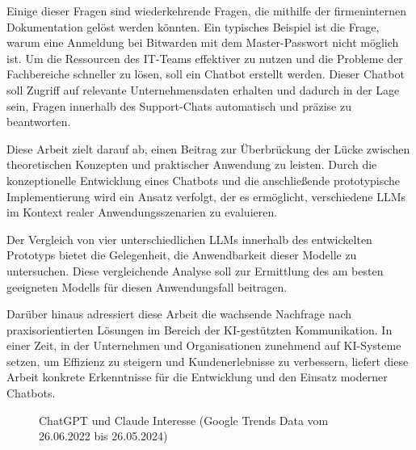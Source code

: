 Einige dieser Fragen sind wiederkehrende Fragen, 
die mithilfe der firmeninternen Dokumentation
gelöst werden könnten. Ein typisches Beispiel ist die Frage, 
warum eine Anmeldung bei Bitwarden mit dem Master-Passwort nicht möglich ist.
 Um die Ressourcen des IT-Teams effektiver zu nutzen und 
die Probleme der Fachbereiche schneller zu lösen,
soll ein Chatbot erstellt werden. 
Dieser Chatbot soll Zugriff auf relevante Unternehmensdaten erhalten und dadurch in 
der Lage sein, Fragen innerhalb des Support-Chats automatisch und präzise zu beantworten. \par
Diese Arbeit zielt darauf ab, einen Beitrag zur Überbrückung der Lücke
 zwischen theoretischen Konzepten und praktischer Anwendung zu leisten. 
 Durch die konzeptionelle Entwicklung eines Chatbots und die anschließende 
 prototypische Implementierung wird ein Ansatz verfolgt, 
 der es ermöglicht, verschiedene LLMs im 
 Kontext realer Anwendungsszenarien zu evaluieren.\par
Der Vergleich von vier unterschiedlichen LLMs innerhalb des entwickelten 
Prototyps bietet die Gelegenheit, die Anwendbarkeit dieser Modelle zu untersuchen. Diese 
vergleichende Analyse soll zur Ermittlung des am besten 
geeigneten Modells für diesen Anwendungsfall beitragen.\par
Darüber hinaus adressiert diese Arbeit die wachsende Nachfrage nach 
praxisorientierten Lösungen im Bereich der KI-gestützten Kommunikation. 
In einer Zeit, in der Unternehmen und Organisationen zunehmend auf KI-Systeme 
setzen, um Effizienz zu steigern und Kundenerlebnisse zu verbessern, 
liefert diese Arbeit konkrete Erkenntnisse für die 
Entwicklung und den Einsatz moderner Chatbots.\par
\begin{figure}[htbp]
    \centering
    \caption{ChatGPT und Claude Interesse (Google Trends Data vom 26.06.2022 bis 26.05.2024)}
    \label{fig:trend_gpt}
\end{figure}
